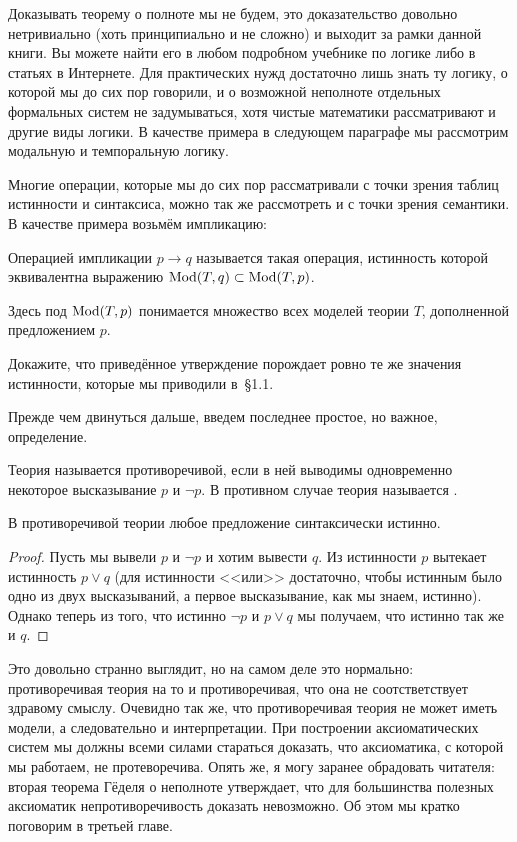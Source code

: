 Доказывать теорему о полноте мы не будем, это доказательство довольно нетривиально (хоть принципиально и не сложно) и выходит за рамки данной книги. Вы можете найти его в любом подробном учебнике по логике либо в статьях в Интернете. Для практических нужд достаточно лишь знать ту логику, о которой мы до сих пор говорили, и о возможной неполноте отдельных формальных систем не задумываться, хотя чистые математики рассматривают и другие виды логики. В качестве примера в следующем параграфе мы рассмотрим модальную и темпоральную логику.

Многие операции, которые мы до сих пор рассматривали с точки зрения таблиц истинности и синтаксиса, можно так же рассмотреть и с точки зрения семантики.  В качестве примера возьмём импликацию:

\begin{definition}
Операцией импликации $p\to q$ называется такая операция, истинность которой эквивалентна выражению $\operatorname{Mod}(T, q)\subset\operatorname{Mod}(T, p)$.
\end{definition}

Здесь под $\operatorname{Mod}(T, p)$ понимается множество всех моделей теории $T$, дополненной предложением $p$.

\begin{exercise}
Докажите, что приведённое утверждение порождает ровно те же значения истинности, которые мы приводили в~\S1.1.
\end{exercise}

Прежде чем двинуться дальше, введем последнее простое, но важное, определение.

\begin{definition}
Теория называется противоречивой, если в ней выводимы одновременно некоторое высказывание $p$ и $\neg p$. В противном случае теория называется .
\end{definition}

\begin{thm}
В противоречивой теории любое предложение синтаксически истинно.
\end{thm}
\begin{proof}
Пусть мы вывели $p$ и $\neg p$ и хотим вывести $q$. Из истинности $p$ вытекает истинность $p\lor q$ (для истинности <<или>> достаточно, чтобы истинным было одно из двух высказываний, а первое высказывание, как мы знаем, истинно). Однако теперь из того, что истинно $\neg p$ и $p\lor q$ мы получаем, что истинно так же и $q$.
\end{proof}

Это довольно странно выглядит, но на самом деле это нормально: противоречивая теория на то и противоречивая, что она не соотстветствует здравому смыслу. Очевидно так же, что противоречивая теория не может иметь модели, а следовательно и интерпретации. При построении аксиоматических систем мы должны всеми силами стараться доказать, что аксиоматика, с которой мы работаем, не протеворечива. Опять же, я могу заранее обрадовать читателя: вторая теорема Гёделя о неполноте утверждает, что для большинства полезных аксиоматик непротиворечивость доказать невозможно. Об этом мы кратко поговорим в третьей главе.

